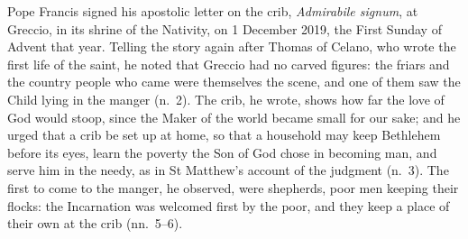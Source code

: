 \noindent Pope Francis signed his apostolic letter on the crib, \emph{Admirabile
signum}, at Greccio, in its shrine of the Nativity, on 1 December 2019, the
First Sunday of Advent that year. Telling the story again after Thomas of
Celano, who wrote the first life of the saint, he noted that Greccio had no
carved figures: the friars and the country people who came were themselves the
scene, and one of them saw the Child lying in the manger (n.~2). The crib, he
wrote, shows how far the love of God would stoop, since the Maker of the world
became small for our sake; and he urged that a crib be set up at home, so that a
household may keep Bethlehem before its eyes, learn the poverty the Son of God
chose in becoming man, and serve him in the needy, as in St Matthew's account of
the judgment (n.~3). The first to come to the manger, he observed, were
shepherds, poor men keeping their flocks: the Incarnation was welcomed first by
the poor, and they keep a place of their own at the crib (nn.~5--6).
